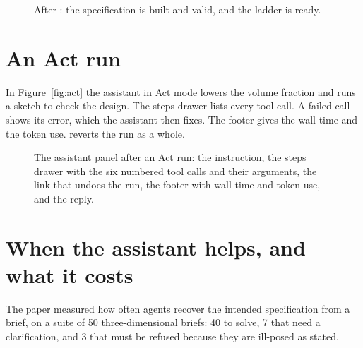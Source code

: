 \begin{figure}[t]
\caption{After : the specification is built and valid, and the ladder is ready.}
\label{fig:accepted}
\end{figure}

\section{An Act run}
In Figure~\ref{fig:act} the assistant in Act mode lowers the volume fraction and runs a sketch to check the design. The
steps drawer lists every tool call. A failed call shows its error, which the assistant then fixes. The footer gives the
wall time and the token use.  reverts the run as a whole.

\begin{figure}[p]
\caption{An Act run: six tool calls (list the regions, set the volume fraction, validate, solve the sketch, wait, read the field
statistics), the 16,000-element sketch in the viewport, and  records in the timeline. The run took 14~s.}
\label{fig:act}
\vspace{8mm}
\begin{minipage}[b]{0.30\linewidth}\end{minipage}\hfill
\begin{minipage}[b]{0.65\linewidth}
\caption{The assistant panel after an Act run: the instruction, the steps drawer with the six numbered tool calls and
their arguments, the link that undoes the run, the footer with wall time and token use, and the reply.}
\label{fig:actpanel}
\end{minipage}
\end{figure}

\section{When the assistant helps, and what it costs}\label{sec:x2}
The paper measured how often agents recover the intended specification from a brief, on a suite of 50 three-dimensional
briefs: 40 to solve, 7 that need a clarification, and 3 that must be refused because they are ill-posed as stated.

